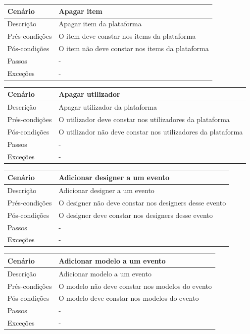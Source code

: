 \documentclass{article}
\begin{document}
\begin{center}
\begin{tabular}{ |p{2.5cm}|p{9cm}| }
\hline
 Cenário & Apagar item \\
\hline
Descrição & Apagar item da plataforma\\
\hline
 Prés-condições & O item  deve constar nos items da plataforma\\
\hline
Pós-condições & O item não deve constar nos items da plataforma\\
\hline
Passos &  - \\
\hline
Exceções & -\\
\hline
\end{tabular}
\end{center}

\begin{center}
\begin{tabular}{ |p{2.5cm}|p{9cm}| }
\hline
 Cenário & Apagar utilizador \\
\hline
Descrição & Apagar utilizador da plataforma\\
\hline
 Prés-condições & O utilizador  deve constar nos utilizadores da plataforma\\
\hline
Pós-condições & O utilizador não deve constar nos utilizadores da plataforma\\
\hline
Passos &  - \\
\hline
Exceções & -\\
\hline
\end{tabular}
\end{center}

\begin{center}
\begin{tabular}{ |p{2.5cm}|p{9cm}| }
\hline
 Cenário & Adicionar designer a um evento \\
\hline
Descrição & Adicionar designer a um evento\\
\hline
 Prés-condições & O designer não deve constar nos designers desse evento\\
\hline
Pós-condições & O designer deve constar nos designers desse evento\\
\hline
Passos &  - \\
\hline
Exceções & -\\
\hline
\end{tabular}
\end{center}


\begin{center}
\begin{tabular}{ |p{2.5cm}|p{9cm}| }
\hline
 Cenário & Adicionar modelo a um evento\\
\hline
Descrição & Adicionar modelo a um evento\\
\hline
 Prés-condições & O modelo não deve constar nos modelos do evento\\
\hline
Pós-condições & O modelo deve constar nos modelos do evento\\
\hline
Passos &  - \\
\hline
Exceções & -\\
\hline
\end{tabular}
\end{center}
\end{document}
